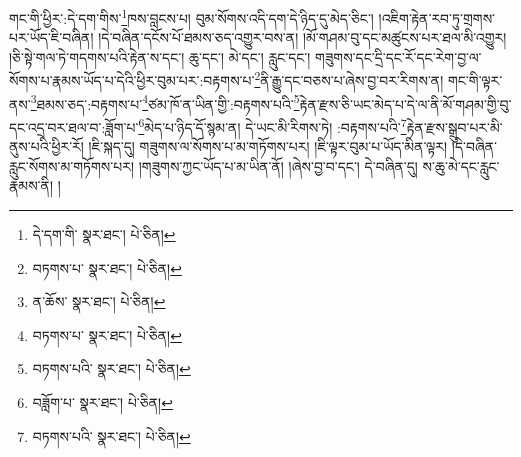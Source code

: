 གང་གི་ཕྱིར་:དེ་དག་གིས་\footnote{དེ་དག་གི་  སྣར་ཐང་།  པེ་ཅིན། }ཁས་བླངས་པ། བུམ་སོགས་འདི་དག་དེ་ཉིད་དུ་མེད་ཅིང་། །འཇིག་རྟེན་རབ་ཏུ་གྲགས་པར་ཡོད་ཇི་བཞིན། །དེ་བཞིན་དངོས་པོ་ཐམས་ཅད་འགྱུར་བས་ན། །མོ་གཤམ་བུ་དང་མཚུངས་པར་ཐལ་མི་འགྱུར། །ཅི་སྟེ་གལ་ཏེ་གདགས་པའི་རྟེན་ས་དང་། ཆུ་དང་། མེ་དང་། རླུང་དང་། གཟུགས་དང་དྲི་དང་རོ་དང་རེག་བྱ་ལ་སོགས་པ་རྣམས་ཡོད་པ་དེའི་ཕྱིར་བུམ་པར་:བརྟགས་པ་\footnote{བཏགས་པ་  སྣར་ཐང་།  པེ་ཅིན། }ནི་རྒྱུ་དང་བཅས་པ་ཞེས་བྱ་བར་རིགས་ན། གང་གི་ལྟར་ནས་\footnote{ན་ཆོས་  སྣར་ཐང་།  པེ་ཅིན། }ཐམས་ཅད་:བརྟགས་པ་\footnote{བཏགས་པ་  སྣར་ཐང་།  པེ་ཅིན། }ཙམ་ཁོ་ན་ཡིན་གྱི་:བརྟགས་པའི་\footnote{བཏགས་པའི་  སྣར་ཐང་།  པེ་ཅིན། }རྟེན་རྫས་ཅི་ཡང་མེད་པ་དེ་ལ་ནི་མོ་གཤམ་གྱི་བུ་དང་འདྲ་བར་ཐལ་བ་:ཟློག་པ་\footnote{བཟློག་པ་  སྣར་ཐང་།  པེ་ཅིན། }མེད་པ་ཉིད་དོ་སྙམ་ན། དེ་ཡང་མི་རིགས་ཏེ། :བརྟགས་པའི་\footnote{བཏགས་པའི་  སྣར་ཐང་།  པེ་ཅིན། }རྟེན་རྫས་སྒྲུབ་པར་མི་ནུས་པའི་ཕྱིར་རོ། །ཇི་སྐད་དུ། གཟུགས་ལ་སོགས་པ་མ་གཏོགས་པར། །ཇི་ལྟར་བུམ་པ་ཡོད་མིན་ལྟར། །དེ་བཞིན་རླུང་སོགས་མ་གཏོགས་པར། །གཟུགས་ཀྱང་ཡོད་པ་མ་ཡིན་ནོ། །ཞེས་བྱ་བ་དང་། དེ་བཞིན་དུ། ས་ཆུ་མེ་དང་རླུང་རྣམས་ནི། །
